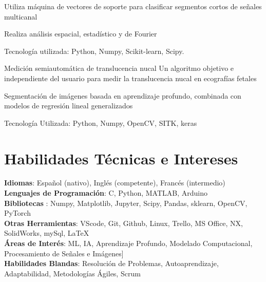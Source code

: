       \resumeItemListStart
        \item {Utiliza máquina de vectores de soporte para clasificar segmentos cortos de señales multicanal}
        \item {Realiza análisis espacial, estadístico y de Fourier}
        \item {Tecnología utilizada: Python, Numpy, Scikit-learn, Scipy.}
    \resumeItemListEnd
    \vspace{0.5mm}

    \resumeProject
      {Medición semiautomática de translucencia nucal} %
      {Un algoritmo objetivo e independiente del usuario para medir la translucencia nucal en ecografías fetales} %
      {} %

      \resumeItemListStart
        \item {Segmentación de imágenes basada en aprendizaje profundo, combinada con modelos de regresión lineal generalizados}
        \item {Tecnología Utilizada: Python, Numpy, OpenCV, SITK, keras}
    \resumeItemListEnd

  \resumeSubHeadingListEnd


\vspace{-5.5mm}
\section{\textbf{Habilidades Técnicas e Intereses}}
 \begin{itemize}[leftmargin=0.05in, label={}]
    \small{\item{
    \textbf{Idiomas}{: Español (nativo), Inglés (competente), Francés (intermedio) } \\
     \textbf{Lenguajes de Programación}{: C, Python, MATLAB, Arduino } \\
     \textbf{Bibliotecas }{: Numpy, Matplotlib, Jupyter, Scipy, Pandas, sklearn, OpenCV, PyTorch}\\
     \textbf{Otras Herramientas}{: VScode, Git, Github, Linux, Trello, MS Office, NX, SolidWorks, mySql, \LaTeX } \\

     \textbf{Áreas de Interés}{: ML, IA, Aprendizaje Profundo, Modelado Computacional, Procesamiento de Señales e Imágenes]} \\
     \textbf{Habilidades Blandas}{: Resolución de Problemas, Autoaprendizaje, Adaptabilidad, Metodologías Ágiles, Scrum} \\
    }}
 \end{itemize}


